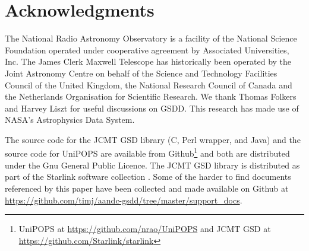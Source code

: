 \documentclass[final,authoryear,5p,times,twocolumn]{elsarticle}
\newcommand{\ascl}[1]{\href{http://www.ascl.net/#1}{ascl:#1}}
\begin{document}
\section*{Acknowledgments}

The National Radio Astronomy Observatory is a facility of the National
Science Foundation operated under cooperative agreement by Associated
Universities, Inc.
The James Clerk Maxwell Telescope has historically been operated by
the Joint Astronomy Centre on behalf of the Science and Technology
Facilities Council of the United Kingdom, the National Research
Council of Canada and the Netherlands Organisation for Scientific
Research. We thank Thomas Folkers and Harvey Liszt for useful
discussions on GSDD. This research has made use of NASA's Astrophysics
Data System.

The source code for the JCMT GSD library (C, Perl wrapper, and Java)
and the source code for UniPOPS are available from
Github\footnote{UniPOPS at \url{https://github.com/nrao/UniPOPS} and JCMT
  GSD at \url{https://github.com/Starlink/starlink}}
and both are distributed under the Gnu General Public Licence. The
JCMT GSD library is distributed as part of the Starlink software
collection \citep[see e.g.,][\ascl{1110.012}]{2014ASPC..485..391C}.
Some of the harder to find documents referenced by this paper have
been collected and made available on Github at
\url{https://github.com/timj/aandc-gsdd/tree/master/support_docs}.
\end{document}
